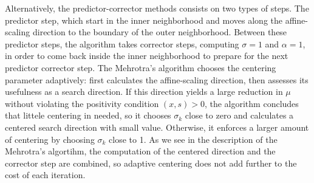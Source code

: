 \documentclass[a4paper,10 pt,titlepage,twoside]{book}
\theoremstyle{plain}
\theoremstyle{definition}
\theoremstyle{remark}
\begin{document}
Alternatively, the predictor-corrector methods consists on two types of steps. The predictor step, which start in the inner neighborhood and moves along the affine-scaling direction to the boundary of the outer neighborhood. Between these predictor steps, the algorithm takes corrector steps, computing $\sigma = 1$ and $\alpha= 1$, in order to come back inside the inner neighborhood to prepare for the next predictor corrector step. The Mehrotra's algorithm chooses the centering parameter adaptively: first calculates the affine-scaling direction, then assesses its usefulness as a search direction. If this direction yields a large reduction in $\mu$ without violating the positivity condition $(x, s)> 0$, the algorithm concludes that littele centering in needed, so it chooses $\sigma_{k}$ close to zero and calculates a centered search direction with small value. Otherwise, it enforces a larger amount of centering by choosing $\sigma_{k}$ close to 1. As we see in the description of the Mehrotra's algortihm, the computation of the centered direction and the corrector step are combined, so adaptive centering does not add further to the cost of each iteration. 
\end{document}
